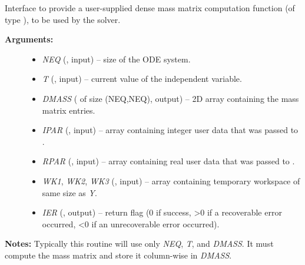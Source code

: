 \documentclass[letterpaper,10pt,english]{sphinxmanual}
\begin{document}
\begin{fulllineitems}
\label{f_interface/Usage:f/_/FARKDMASS}
Interface to provide a user-supplied dense mass matrix computation
function (of type {\hyperref[c_interface/User_supplied:c.ARKDlsDenseMassFn]{\emph{}}}), to be used by the
{\hyperref[f_interface/Usage:f/_/FARKMASSDENSE]{\emph{}}} solver.
\begin{description}
\item[{\textbf{Arguments:}}] \leavevmode\begin{itemize}
\item {} 
\emph{NEQ} (, input) -- size of the ODE system.

\item {} 
\emph{T} (, input) -- current value of the independent variable.

\item {} 
\emph{DMASS} ( of size (NEQ,NEQ), output) -- 2D array
containing the mass matrix entries.

\item {} 
\emph{IPAR} (, input) -- array containing integer user data that was passed to
{\hyperref[f_interface/Usage:f/_/FARKMALLOC]{\emph{}}}.

\item {} 
\emph{RPAR} (, input) -- array containing real user data that was passed to
{\hyperref[f_interface/Usage:f/_/FARKMALLOC]{\emph{}}}.

\item {} 
\emph{WK1}, \emph{WK2}, \emph{WK3}  (, input) -- array containing temporary workspace
of same size as \emph{Y}.

\item {} 
\emph{IER} (, output) -- return flag (0 if success, \textgreater{}0 if a recoverable error
occurred, \textless{}0 if an unrecoverable error occurred).

\end{itemize}

\end{description}

\textbf{Notes:} Typically this routine will use only \emph{NEQ}, \emph{T}, and
\emph{DMASS}. It must compute the mass matrix and store it column-wise in \emph{DMASS}.

\end{fulllineitems}
\end{document}
